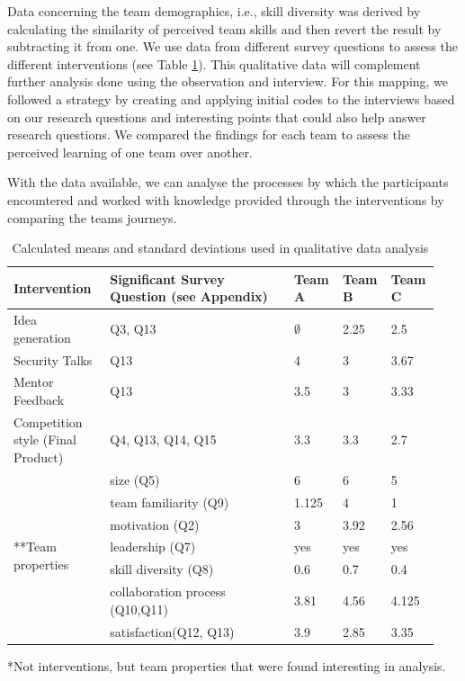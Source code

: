 \documentclass[runningheads]{llncs}
\begin{document}
Data concerning the team demographics, i.e., skill diversity was derived by calculating the similarity of perceived team skills and then revert the result by subtracting it from one.
We use data from different survey questions to assess the different interventions (see Table \ref{tab:teambinter}). This qualitative data will complement further analysis done using the observation and interview. For this mapping, we followed a strategy \cite{braun2006using} by creating and applying initial codes to the interviews based on our research questions and interesting points that could also help answer research questions. We compared the findings for each team to assess the perceived learning of one team over another.

With the data available, we can analyse the processes by which the participants encountered and worked with knowledge provided through the interventions by comparing the teams journeys.
\begin{table}[h]
    \caption{Calculated means and standard deviations used in qualitative data analysis}
    \label{tab:teambinter}
    \begin{tabular}{|p{0.22\linewidth}|p{0.42\linewidth}|p{0.1\linewidth}|p{0.1\linewidth}|p{0.1\linewidth}|}\hline
	Intervention & Significant \newline Survey Question (see Appendix) &  Team A & Team B & Team C \\ \hline
	Idea generation & Q3, Q13 & $\emptyset$ & 2.25 & 2.5  \\ \hline
	Security Talks  & Q13 &  4 & 3 & 3.67   \\ \hline
	Mentor Feedback  & Q13 &  3.5 & 3 & 3.33 \\ \hline
	Competition style \newline (Final Product) & Q4, Q13, Q14, Q15 & 3.3 & 3.3 & 2.7   \\ \hline
	\multirow{8}{*}{**Team properties} & size (Q5) & 6 & 6 & 5  \\\cline{2-5}
	& team familiarity (Q9) & 1.125 & 4 & 1  \\ \cline{2-5}
	& motivation (Q2) & 3 & 3.92 & 2.56  \\ \cline{2-5}
	& leadership (Q7) & yes & yes & yes  \\ \cline{2-5}
	& skill diversity (Q8) & 0.6 & 0.7 & 0.4  \\ \cline{2-5}
	& collaboration process (Q10,Q11) & 3.81 & 4.56 & 4.125  \\ \cline{2-5}
	& satisfaction(Q12, Q13) & 3.9 & 2.85 & 3.35  \\ \hline
    \end{tabular}
    *Not interventions, but team properties that were found interesting in analysis.
\end{table}
\end{document}
